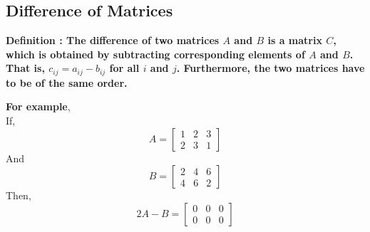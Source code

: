\documentclass[12pt, letterpaper]{article}
\begin{document}
\subsection{Difference of Matrices}
\begin{displayquote}
\textbf{Definition : The difference of two matrices $A$ and $B$ is a matrix $C$, which is obtained by subtracting corresponding elements of $A$ and $B$. That is, $c_{ij} = a_{ij} - b_{ij}$ for all $i$ and $j$. Furthermore, the two matrices have to be of the same order.} 
\end{displayquote}
\textbf{For example},\\
If, 
\begin{displaymath}
A = \begin{bmatrix}
1 & 2 & 3\\
2 & 3 & 1
\end{bmatrix}
\end{displaymath} 
And 
\begin{displaymath}
B = \begin{bmatrix}
2 & 4 & 6\\
4 & 6 & 2
\end{bmatrix}
\end{displaymath}
Then,
\begin{displaymath}
 2A - B = \begin{bmatrix}
0 & 0 & 0\\
0 & 0 & 0
\end{bmatrix}
\end{displaymath}
\end{document}
